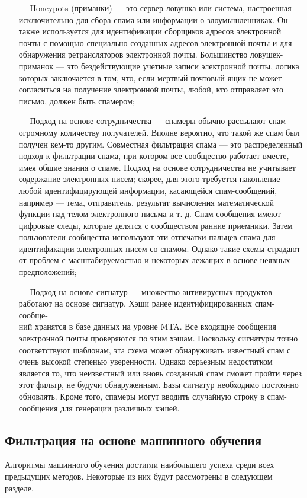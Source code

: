 \begin{itemize}
    \item[—] Honeypots (приманки) — это сервер-ловушка или система, настроенная исключительно для сбора спама или
        информации о злоумышленниках. Он также используется для идентификации сборщиков адресов электронной
        почты с помощью специально созданных адресов электронной почты и для обнаружения ретрансляторов
        электронной почты. Большинство ловушек-приманок — это бездействующие учетные записи электронной почты,
        логика которых заключается в том, что, если мертвый почтовый ящик не может согласиться на получение
        электронной почты, любой, кто отправляет это письмо, должен быть спамером;
    \item[—] Подход на основе сотрудничества — спамеры обычно рассылают спам огромному количеству получателей. Вполне вероятно, что такой же спам
        был получен кем-то другим. Совместная фильтрация спама — это распределенный подход к фильтрации спама,
        при котором все сообщество работает вместе, имея общие знания о спаме. Подход на основе сотрудничества
        не учитывает содержание электронных писем; скорее, для этого требуется накопление любой идентифицирующей
        информации, касающейся спам-сообщений, например — тема, отправитель, результат вычисления математической
        функции над телом электронного письма и т. д. Спам-сообщения имеют цифровые следы, которые делятся с
        сообществом ранние приемники. Затем пользователи сообщества используют эти отпечатки пальцев спама для
        идентификации электронных писем со спамом. Однако такие схемы страдают от проблем с
        масштабируемостью и некоторых лежащих в основе неявных предположений;
    \item[—] Подход на основе сигнатур — множество антивирусных продуктов работают на основе сигнатур. Хэши ранее
        идентифицированных спам-сообще-\\ний хранятся в базе данных на уровне MTA. Все входящие сообщения
        электронной почты проверяются по этим хэшам. Поскольку сигнатуры точно соответствуют шаблонам,
        эта схема может обнаруживать известный спам с очень высокой степенью уверенности.
        Однако серьезным недостатком является то, что неизвестный или вновь созданный спам сможет
        пройти через этот фильтр, не будучи обнаруженным. Базы сигнатур необходимо постоянно обновлять.
        Кроме того, спамеры могут вводить случайную строку в спам-сообщения для генерации различных хэшей.
\end{itemize}

\subsection{Фильтрация на основе машинного обучения}
Алгоритмы машинного обучения достигли наибольшего успеха среди
всех предыдущих методов. Некоторые из них будут рассмотрены в следующем разделе.
